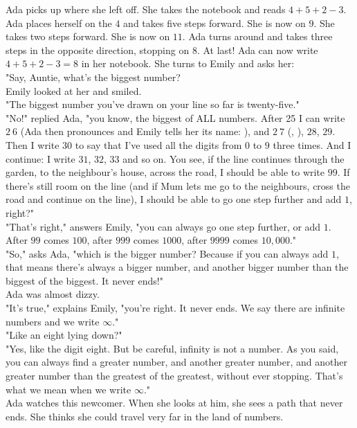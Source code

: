 Ada picks up where she left off. 
She takes the notebook and reads $4 + 5 + 2 - 3$.
Ada places herself on the $4$ and takes five steps forward. 
She is now on $9$. 
She takes two steps forward. She is now on $11$. 
Ada turns around and takes three steps in the opposite direction, stopping on $8$.
At last! Ada can now write $4 + 5 + 2 - 3 = 8$ in her notebook.
She turns to Emily and asks her: \\
"Say, Auntie, what's the biggest number? \\
Emily looked at her and smiled.\\
"The biggest number you've drawn on your line so far is twenty-five."\\
"No!" replied Ada, "you know, the biggest of ALL numbers. After 25 I can write $2~6$ (Ada then pronounces  and Emily tells her its name: ), and $2~7$ (, ), $28$, $29$. Then I write $30$ to say that I've used all the digits from $0$ to $9$ three times. And I continue: I write $31$, $32$, $33$ and so on. You see, if the line continues through the garden, to the neighbour's house, across the road, I should be able to write $99$. If there's still room on the line (and if Mum lets me go to the neighbours, cross the road and continue on the line), I should be able to go one step further and add $1$, right?"\\
"That's right," answers Emily, "you can always go one step further, or add $1$. After $99$ comes $100$, after $999$ comes $1000$, after $9999$ comes $10,000$."\\
"So," asks Ada, "which is the bigger number? Because if you can always add $1$, that means there's always a bigger number, and another bigger number than the biggest of the biggest. It never ends!"\\ 
Ada was almost dizzy. \\
"It's true," explains Emily, "you're right. It never ends. We say there are infinite numbers and we write $\infty$."\\
"Like an eight lying down?"\\
"Yes, like the digit eight. But be careful, infinity is not a number. As you said, you can always find a greater number, and another greater number, and another greater number than the greatest of the greatest, without ever stopping. That's what we mean when we write $\infty$."\\
Ada watches this newcomer. When she looks at him, she sees a path that never ends. She thinks she could travel very far in the land of numbers.

